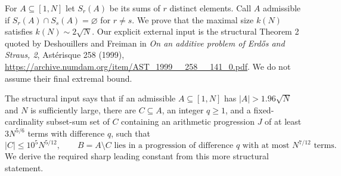 For $A\subseteq[1,N]$ let $S_r(A)$ be its sums of $r$ distinct elements. Call $A$ admissible if $S_r(A)\cap S_s(A)=\varnothing$ for $r\ne s$. We prove that the maximal size $k(N)$ satisfies $k(N)\sim2\sqrt N$. Our explicit external input is the structural Theorem 2 quoted by Deshouillers and Freiman in \emph{On an additive problem of Erd\H{o}s and Straus, 2}, Ast\'erisque 258 (1999), \url{https://archive.numdam.org/item/AST_1999__258__141_0.pdf}. We do not assume their final extremal bound.

The structural input says that if an admissible $A\subseteq[1,N]$ has $|A|>1.96\sqrt N$ and $N$ is sufficiently large, there are $C\subseteq A$, an integer $q\ge1$, and a fixed-cardinality subset-sum set of $C$ containing an arithmetic progression $J$ of at least $3N^{5/6}$ terms with difference $q$, such that
\[
 |C|\le10^5N^{5/12},\qquad B=A\setminus C
 \text{ lies in a progression of difference }q\text{ with at most }N^{7/12}\text{ terms}.\tag{1}
\]
We derive the required sharp leading constant from this more structural statement.

